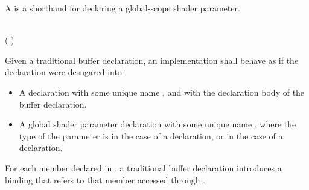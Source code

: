 \begin{Legacy}


A  is a shorthand for declaring a global-scope shader parameter.

\begin{Syntax}
     \\
        ( \SynOr {})   \code{;}\SynOpt
\end{Syntax}

Given a traditional buffer declaration, an implementation shall behave as if the declaration were desugared into:

\begin{itemize}
\item A  declaration with some unique name , and with the declaration body of the buffer declaration.
\item A global shader parameter declaration with some unique name , where the type of the parameter is  in the case of a  declaration, or  in the case of a  declaration.
\end{itemize}

For each member declared in , a traditional buffer declaration introduces a binding that refers to that member accessed through .

\end{Legacy}